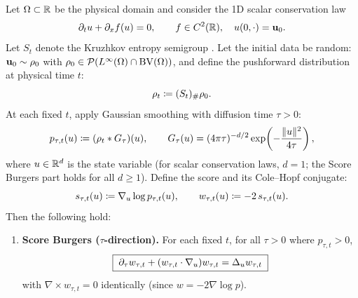 
\begin{theorem}
\label{thm:double-burgers-app}
Let $\Omega \subset \mathbb{R}$ be the physical domain and consider the 1D scalar conservation law
\begin{equation}
\partial_{t} u + \partial_{x} f(u) = 0, \qquad f \in C^{2}(\mathbb{R}), \quad u(0,\cdot) = \mathbf{u}_{0} .
\label{eq:thm1-claw}
\end{equation}
Let $S_{t}$ denote the Kruzhkov entropy semigroup \citep{kruzhkov1970}. Let the initial data be random: $\mathbf{u}_{0} \sim \rho_{0}$ with $\rho_{0} \in \mathcal{P}(L^{\infty}(\Omega) \cap \mathrm{BV}(\Omega))$, and define the pushforward distribution at physical time $t$:
\begin{equation}
\rho_{t} \coloneqq (S_{t})_{\#} \rho_{0}.
\label{eq:thm1-pushforward}
\end{equation}
At each fixed $t$, apply Gaussian smoothing with diffusion time $\tau > 0$:
\begin{equation}
p_{\tau, t}(u) \coloneqq (\rho_{t} * G_{\tau})(u), \qquad
G_{\tau}(u) = (4\pi\tau)^{-d/2} \exp\!\left(-\frac{\lVert u \rVert^{2}}{4\tau}\right),
\label{eq:thm1-gaussian-smoothing}
\end{equation}
where $u \in \mathbb{R}^{d}$ is the state variable (for scalar conservation laws, $d = 1$; the Score Burgers part holds for all $d \ge 1$). Define the score and its Cole--Hopf conjugate:
\begin{equation}
s_{\tau, t}(u) \coloneqq \nabla_{u} \log p_{\tau, t}(u), \qquad
w_{\tau, t}(u) \coloneqq -2\, s_{\tau, t}(u).
\label{eq:thm1-score-def}
\end{equation}
Then the following hold:
\begin{enumerate}
\item[(A)] \textbf{Score Burgers ($\tau$-direction).} For each fixed $t$, for all $\tau > 0$ where $p_{\tau, t} > 0$,
\begin{equation}
\boxed{\; \partial_{\tau} w_{\tau, t} + (w_{\tau, t} \cdot \nabla_{u}) w_{\tau, t} = \Delta_{u} w_{\tau, t} \;}
\label{eq:thm1-score-burgers}
\end{equation}
with $\nabla \times w_{\tau, t} = 0$ identically (since $w = -2\nabla \log p$).


\end{enumerate}
\end{theorem}

